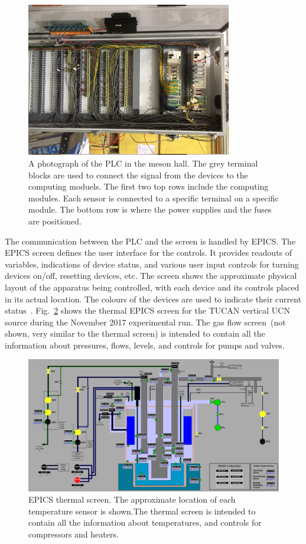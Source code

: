 \begin{figure}[h!]
  \centering
  \includegraphics[width=0.8\textwidth, angle = 90]{PLC.JPG}
  \caption{A photograph of the PLC in the meson hall. The grey
    terminal blocks are used to connect the signal from the devices to
    the computing moduels. The first two top rows include the
    computing modules. Each sensor is connected to a specific terminal
    on a specific module. The bottom row is where the power supplies
    and the fuses are positioned. }
  \label{fig:PLC}
\end{figure}
The communication between the PLC and the screen is handled by EPICS.
The EPICS screen defines the user interface for the controls. It
provides readouts of variables, indications of device status, and
various user input controls for turning devices on/off, resetting
devices, etc. The screen shows the approximate physical layout of the
apparatus being controlled, with each device and its controls placed
in its actual location. The colours of the devices are used to
indicate their current status~\cite{Sean_manual}. Fig.~\ref{fig:epics}
shows the thermal EPICS screen for the TUCAN vertical UCN source
during the November 2017 experimental run. The gas flow screen~(not
shown, very similar to the thermal screen) is intended to contain all
the information about pressures, flows, levels, and controls for pumps and
valves.

\begin{figure}[h!]
  \centering
  \includegraphics[width=1.0\textwidth]{epics.png}
  \caption{EPICS thermal screen. The approximate location of each
    temperature sensor is shown.The thermal screen is intended to
    contain all the information about temperatures, and controls for
    compressors and heaters. }
  \label{fig:epics}
\end{figure}

